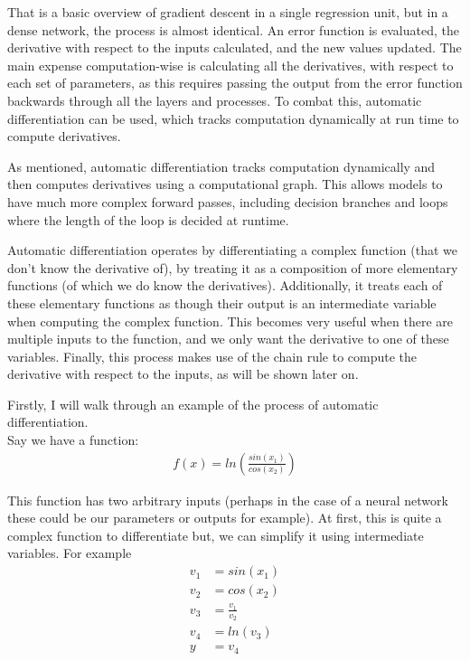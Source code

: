 \documentclass{article}
\makeatletter
\newcommand\subsubsubsection{\@startsection{paragraph}{4}{\z@}{-2.5ex\@plus -1ex \@minus -.25ex}{1.25ex \@plus .25ex}{\normalfont\normalsize\bfseries}}
\makeatother
\begin{document}
    That is a basic overview of gradient descent in a single regression unit, but in a dense network, the process is almost identical. An error function is evaluated, 
    the derivative with respect to the inputs calculated, and the new values updated. The main expense computation-wise is calculating all the derivatives, with respect to
    each set of parameters, as this requires passing the output from the error function backwards through all the layers and processes. To combat this, automatic differentiation
    can be used, which tracks computation dynamically at run time to compute derivatives.

    \subsubsubsection{Automatic Differentiation} \label{Autodiff-example}
    As mentioned, automatic differentiation tracks computation dynamically and then computes derivatives using a computational graph. This allows models to
    have much more complex forward passes, including decision branches and loops where the length of the loop is decided at runtime.

    Automatic differentiation operates by differentiating a complex function (that we don't know the derivative of), by treating it as a composition of more elementary functions
    (of which we do know the derivatives). Additionally, it treats each of these elementary functions as though their output is an intermediate variable when computing the
    complex function. This becomes very useful when there are multiple inputs to the function, and we only want the derivative to one of these variables. Finally, this process
    makes use of the chain rule to compute the derivative with respect to the inputs, as will be shown later on.

    Firstly, I will walk through an example of the process of automatic differentiation.\\
    \noindent Say we have a function: \begin{align}
        f(x) = ln\left(\frac{sin(x_1)}{cos(x_2)}\right)
    \end{align}

    This function has two arbitrary inputs (perhaps in the case of a neural network these could be our parameters or outputs for example). At first, this is quite a complex
    function to differentiate but, we can simplify it using intermediate variables. For example \begin{align}
        v_1 &= sin(x_1)\\
        v_2 &= cos(x_2)\\
        v_3 &= \frac{v_1}{v_2}\\
        v_4 &= ln(v_3)\\
        y &= v_4
    \end{align}
\end{document}
